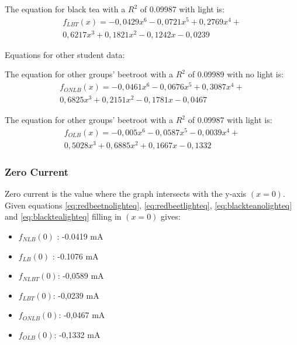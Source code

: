 \documentclass[conference]{IEEEtran}
\begin{document}
\noindent The equation for black tea with a  $R^2$ of 0.09987 with light is: 
\begin{equation} \label{eq:blacktealighteq} 
\begin{aligned}
f_{LBT}(x) = -0,0429x^6 - 0,0721x^5 + 0,2769x^4 + \\0,6217x^3 + 0,1821x^2 - 0,1242x - 0,0239
\end{aligned}
\end{equation}

\noindent Equations for other student data:

\noindent The equation for other groups' beetroot with a $R^2$ of 0.09989 with no light is: 
\begin{equation} \label{eq:otherredbeetlighteq} 
\begin{aligned}
f_{ONLB}(x) = -0,0461x^6 - 0,0676x^5 + 0,3087x^4 +\\ 0,6825x^3 + 0,2151x^2 - 0,1781x - 0,0467
\end{aligned}
\end{equation}

\noindent The equation for other groups' beetroot with a $R^2$ of 0.09987 with light is: 
\begin{equation} \label{eq:otherredbeetlighteq} 
\begin{aligned}
f_{OLB}(x) = -0,005x^6 - 0,0587x^5 - 0,0039x^4 +\\ 0,5028x^3 + 0,6885x^2 + 0,1667x - 0,1332
\end{aligned}
\end{equation}


\subsubsection{Zero Current}
Zero current is the value where the graph intersects with the y-axis $(x = 0)$.
Given equations \ref{eq:redbeetnolighteq}, \ref{eq:redbeetlighteq}, \ref{eq:blackteanolighteq} and \ref{eq:blacktealighteq} filling in $(x = 0)$ gives:
\begin{itemize}
 \item$f_{NLB}(0)$ : -0.0419 mA
 \item$f_{LB}(0)$ : -0.1076 mA
 \item$f_{NLBT}(0)$: -0,0589 mA
 \item$f_{LBT}(0)$: -0,0239 mA
 \item$f_{ONLB}(0)$: -0,0467 mA
 \item$f_{OLB}(0)$: -0,1332 mA
\end{itemize}
\end{document}
